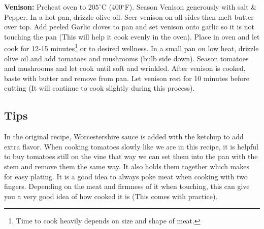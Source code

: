 \vspace{0.25cm}

\textbf{Venison:} Preheat oven to $205^\circ$C (400$^\circ$F). Season Venison generously with salt \& Pepper. In a hot pan, drizzle olive oil. Seer venison on all sides then melt butter over top. Add peeled Garlic cloves to pan and set venison onto garlic so it is not touching the pan (This will help it cook evenly in the oven). Place in oven and let cook for 12-15 minutes\footnote{Time to cook heavily depends on size and shape of meat.} or to desired wellness. In a small pan on low heat, drizzle olive oil and add tomatoes and mushrooms (bulb side down). Season tomatoes and mushrooms and let cook until soft and wrinkled. After venison is cooked, baste with butter and remove from pan. Let venison rest for 10 minutes before cutting (It will continue to cook slightly during this process).

\subsection*{Tips}

In the original recipe, Worcestershire sauce is added with the ketchup to add extra flavor. When cooking tomatoes slowly like we are in this recipe, it is helpful to buy tomatoes still on the vine that way we can set them into the pan with the stem and remove them the same way. It also holds them together which makes for easy plating. It is a good idea to always poke meat when cooking with two fingers. Depending on the meat and firmness of it when touching, this can give you a very good idea of how cooked it is (This comes with practice).